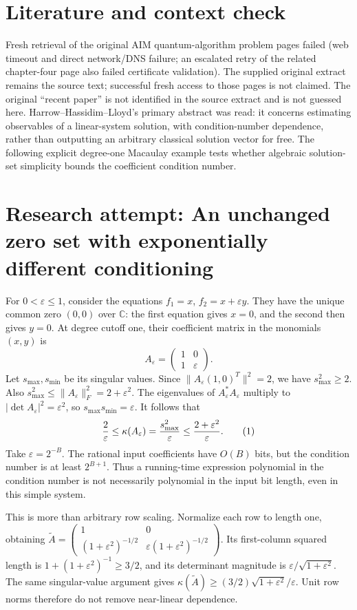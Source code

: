 \documentclass[11pt]{article}
\begin{document}
\section{Literature and context check}
Fresh retrieval of the original AIM quantum-algorithm problem pages failed (web timeout and direct network/DNS failure; an escalated retry of the related chapter-four page also failed certificate validation). The supplied original extract remains the source text; successful fresh access to those pages is not claimed. The original ``recent paper'' is not identified in the source extract and is not guessed here. Harrow--Hassidim--Lloyd's primary abstract was read: it concerns estimating observables of a linear-system solution, with condition-number dependence, rather than outputting an arbitrary classical solution vector for free. The following explicit degree-one Macaulay example tests whether algebraic solution-set simplicity bounds the coefficient condition number.
\section{Research attempt: An unchanged zero set with exponentially different conditioning}
For $0<\varepsilon\leq1$, consider the equations $f_1=x$, $f_2=x+\varepsilon y$. They have the unique common zero $(0,0)$ over $\mathbb C$: the first equation gives $x=0$, and the second then gives $y=0$. At degree cutoff one, their coefficient matrix in the monomials $(x,y)$ is
\[
 A_\varepsilon=\begin{pmatrix}1&0\\1&\varepsilon\end{pmatrix}.
\]
Let $s_{\max},s_{\min}$ be its singular values. Since $\|A_\varepsilon(1,0)^T\|^2=2$, we have $s_{\max}^2\geq2$. Also $s_{\max}^2\leq\|A_\varepsilon\|_F^2=2+\varepsilon^2$. The eigenvalues of $A_\varepsilon^*A_\varepsilon$ multiply to $|\det A_\varepsilon|^2=\varepsilon^2$, so $s_{\max}s_{\min}=\varepsilon$. It follows that
\[
 {2\over\varepsilon}\leq\kappa(A_\varepsilon)
 ={s_{\max}^2\over\varepsilon}\leq{2+\varepsilon^2\over\varepsilon}. \tag{1}
\]
Take $\varepsilon=2^{-B}$. The rational input coefficients have $O(B)$ bits, but the condition number is at least $2^{B+1}$. Thus a running-time expression polynomial in the condition number is not necessarily polynomial in the input bit length, even in this simple system.

This is more than arbitrary row scaling. Normalize each row to length one, obtaining
$\widetilde A=\begin{pmatrix}1&0\\(1+\varepsilon^2)^{-1/2}&\varepsilon(1+\varepsilon^2)^{-1/2}\end{pmatrix}$.
Its first-column squared length is $1+(1+\varepsilon^2)^{-1}\geq3/2$, and its determinant magnitude is $\varepsilon/\sqrt{1+\varepsilon^2}$. The same singular-value argument gives
$\kappa(\widetilde A)\geq(3/2)\sqrt{1+\varepsilon^2}/\varepsilon$.
Unit row norms therefore do not remove near-linear dependence.
\end{document}
